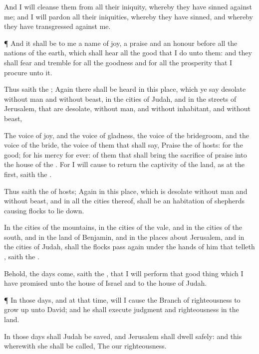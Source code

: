 {And I will
cleanse them from all their
iniquity, whereby they have
sinned against me; and I will
pardon all their
iniquities, whereby they have
sinned, and whereby they have
transgressed against me.


\par }{\PP {}¶ And it shall be to me a
name of
joy, a
praise and an
honour before all the
nations of the
earth, which shall
hear all the
good that I
do unto them: and they shall
fear and
tremble for all the
goodness and for all the
prosperity that I
procure unto it.


\par }{\PP {}Thus
saith the
{}; Again there shall be
heard in this
place, which ye
say
{}
desolate without
man and without
beast,
{} in the
cities of
Judah, and in the
streets of
Jerusalem, that are
desolate, without
man, and without
inhabitant, and without
beast,

The
voice of
joy, and the
voice of
gladness, the
voice of the
bridegroom, and the
voice of the
bride, the
voice of them that shall
say,
Praise the
{} of
hosts: for the
{}
{}
good; for his
mercy
{} for
ever:
{} of them that shall
bring the sacrifice of
praise into the
house of the
{}. For I will cause to
return the
captivity of the
land, as at the
first,
saith the
{}.

Thus
saith the
{} of
hosts; Again in this
place, which is
desolate without
man and without
beast, and in all the
cities thereof, shall be an
habitation of
shepherds causing
{}
flocks to lie
down.

In the
cities of the
mountains, in the
cities of the
vale, and in the
cities of the
south, and in the
land of
Benjamin, and in the places
about
Jerusalem, and in the
cities of
Judah, shall the
flocks pass
again under the
hands of him that
telleth
{},
saith the
{}.

Behold, the
days
come,
saith the
{}, that I will
perform that
good
thing which I have
promised unto the
house of
Israel and to the
house of
Judah.


\par }{\PP {}¶ In those
days, and at that
time, will I cause the
Branch of
righteousness to grow
up unto
David; and he shall
execute
judgment and
righteousness in the
land.

In those
days shall
Judah be
saved, and
Jerusalem shall
dwell
safely: and this
{} wherewith she shall be
called, The
{} our
righteousness.


}
